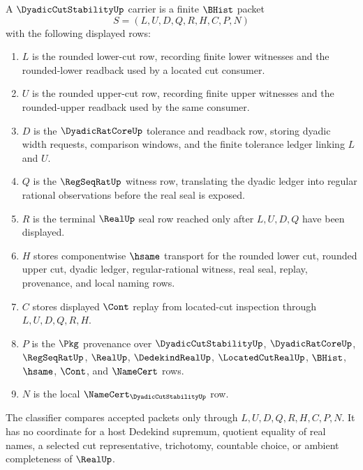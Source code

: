 \begin{definition}
\label{def:dyadic-cut-stability-carrier}
A $\DyadicCutStabilityUp$ carrier is a finite $\BHist$ packet
$$
S=(L,U,D,Q,R,H,C,P,N)
$$
with the following displayed rows:
\begin{enumerate}
\item $L$ is the rounded lower-cut row, recording finite lower witnesses and the rounded-lower readback used by a located cut consumer.
\item $U$ is the rounded upper-cut row, recording finite upper witnesses and the rounded-upper readback used by the same consumer.
\item $D$ is the $\DyadicRatCoreUp$ tolerance and readback row, storing dyadic width requests, comparison windows, and the finite tolerance ledger linking $L$ and $U$.
\item $Q$ is the $\RegSeqRatUp$ witness row, translating the dyadic ledger into regular rational observations before the real seal is exposed.
\item $R$ is the terminal $\RealUp$ seal row reached only after $L,U,D,Q$ have been displayed.
\item $H$ stores componentwise $\hsame$ transport for the rounded lower cut, rounded upper cut, dyadic ledger, regular-rational witness, real seal, replay, provenance, and local naming rows.
\item $C$ stores displayed $\Cont$ replay from located-cut inspection through $L,U,D,Q,R,H$.
\item $P$ is the $\Pkg$ provenance over $\DyadicCutStabilityUp$, $\DyadicRatCoreUp$, $\RegSeqRatUp$, $\RealUp$, $\DedekindRealUp$, $\LocatedCutRealUp$, $\BHist$, $\hsame$, $\Cont$, and $\NameCert$ rows.
\item $N$ is the local $\NameCert_{\DyadicCutStabilityUp}$ row.
\end{enumerate}
The classifier compares accepted packets only through $L,U,D,Q,R,H,C,P,N$. It has no coordinate for a host Dedekind supremum, quotient equality of real names, a selected cut representative, trichotomy, countable choice, or ambient completeness of $\RealUp$.
\end{definition}

